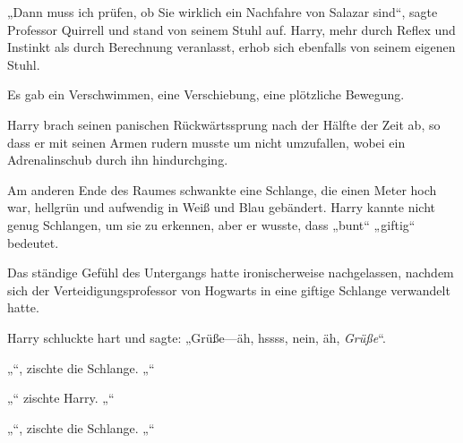 „Dann muss ich prüfen, ob Sie wirklich ein Nachfahre von Salazar sind“, sagte Professor Quirrell und stand von seinem Stuhl auf. Harry, mehr durch Reflex und Instinkt als durch Berechnung veranlasst, erhob sich ebenfalls von seinem eigenen Stuhl.

Es gab ein Verschwimmen, eine Verschiebung, eine plötzliche Bewegung.

Harry brach seinen panischen Rückwärtssprung nach der Hälfte der Zeit ab, so dass er mit seinen Armen rudern musste um nicht umzufallen, wobei ein Adrenalinschub durch ihn hindurchging.

Am anderen Ende des Raumes schwankte eine Schlange, die einen Meter hoch war, hellgrün und aufwendig in Weiß und Blau gebändert. Harry kannte nicht genug Schlangen, um sie zu erkennen, aber er wusste, dass „bunt“ „giftig“ bedeutet.

Das ständige Gefühl des Untergangs hatte ironischerweise nachgelassen, nachdem sich der Verteidigungsprofessor von Hogwarts in eine giftige Schlange verwandelt hatte.

Harry schluckte hart und sagte: „Grüße—äh, hssss, nein, äh, \emph{Grüße}“.

„“, zischte die Schlange. „“

„“ zischte Harry. „“

„“, zischte die Schlange. „“

